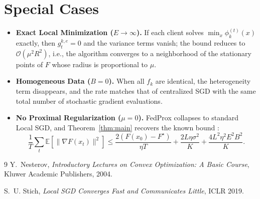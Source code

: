 \documentclass{article}
\begin{document}
\section*{Special Cases}
\begin{itemize}
\item \textbf{Exact Local Minimization ($E\to\infty$).}  
If each client solves $\min_x\phi_k^{(t)}(x)$ exactly, then $g_{t}^{k,e}=0$ and the variance terms vanish; the bound reduces to $\mathcal{O}(\mu^{2}R^{2})$, i.e., the algorithm converges to a neighborhood of the stationary points of $F$ whose radius is proportional to $\mu$.
\item \textbf{Homogeneous Data ($B=0$).}  
When all $f_k$ are identical, the heterogeneity term disappears, and the rate matches that of centralized SGD with the same total number of stochastic gradient evaluations.
\item \textbf{No Proximal Regularization ($\mu=0$).}  
FedProx collapses to standard Local SGD, and Theorem~\ref{thm:main} recovers the known bound \cite{Stich2018}:
\[
\frac{1}{T}\sum_{t}\mathbb{E}[\|\nabla F(x_t)\|^{2}]
\le \frac{2(F(x_0)-F^{\star})}{\eta T}
    +\frac{2L\eta\sigma^{2}}{K}
    +\frac{4L^{2}\eta^{2}E^{2}B^{2}}{K}.
\]
\end{itemize}

\begin{thebibliography}{9}
Y.~Nesterov, \emph{Introductory Lectures on Convex Optimization: A Basic Course}, Kluwer Academic Publishers, 2004.

S.~U. Stich, \emph{Local SGD Converges Fast and Communicates Little}, ICLR 2019.
\end{thebibliography}
\end{document}
